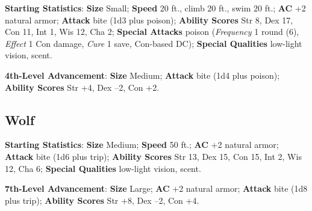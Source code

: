 				
\textbf{Starting Statistics}:\textbf{ Size} Small; \textbf{Speed} 20 ft., climb 20 ft., swim 20 ft.; \textbf{AC} +2 natural armor; \textbf{Attack} bite (1d3 plus poison); \textbf{Ability Scores }Str 8, Dex 17, Con 11, Int 1, Wis 12, Cha 2; \textbf{Special Attacks }poison (\textit{Frequency} 1 round (6), \textit{Effect} 1 Con damage, \textit{Cure} 1 save, Con-based DC); \textbf{Special Qualities} low-light vision, scent.
				
\textbf{4th-Level Advancement}: \textbf{Size }Medium; \textbf{Attack} bite (1d4 plus poison); \textbf{Ability Scores }Str +4, Dex --2, Con +2. 
				
\subsection{Wolf}

				
\textbf{Starting Statistics}:\textbf{ Size} Medium; \textbf{Speed} 50 ft.; \textbf{AC} +2 natural armor; \textbf{Attack} bite (1d6 plus trip); \textbf{Ability Scores }Str 13, Dex 15, Con 15, Int 2, Wis 12, Cha 6; \textbf{Special Qualities} low-light vision, scent.
				
\textbf{7th-Level Advancement}: \textbf{Size }Large; \textbf{AC }+2 natural armor; \textbf{Attack} bite (1d8 plus trip); \textbf{Ability Scores }Str +8, Dex --2, Con +4. 
        	
